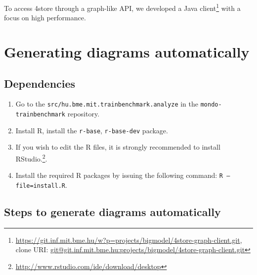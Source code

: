 To access 4store through a graph-like API, we developed a Java client\footnote{\url{https://git.inf.mit.bme.hu/w?p=projects/bigmodel/4store-graph-client.git}, \\ clone URI: \url{git@git.inf.mit.bme.hu:projects/bigmodel/4store-graph-client.git}} with a focus on high performance.


\section{Generating diagrams automatically}

\subsection{Dependencies}

\begin{enumerate}
  \item Go to the \texttt{src/hu.bme.mit.trainbenchmark.analyze} in the \texttt{mondo-trainbenchmark} repository.
  \item Install R, install the \texttt{r-base}, \texttt{r-base-dev} package.
  \item If you wish to edit the R files, it is strongly recommended to install RStudio.\footnote{\url{http://www.rstudio.com/ide/download/desktop}}.
  \item Install the required R packages by issuing the following command: \texttt{R --file=install.R}. 
\end{enumerate}

\subsection{Steps to generate diagrams automatically}

